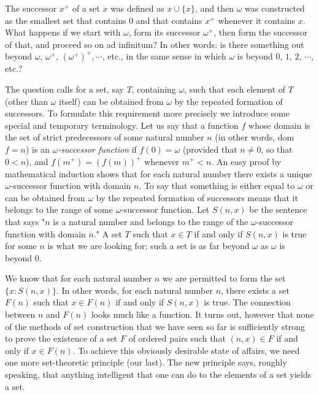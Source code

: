 
The successor $x^{+}$ of a set $x$ was defined as $x \cup \{ x \} $, and then $\omega$ was constructed as the smallest set that contains $0$ and that contains $x^{+}$ whenever it contains $x$. What happens if we start with $\omega$, form its successor $\omega^{+}$, then form the successor of that, and proceed so on ad infinitum? In other words: is there something out beyond $\omega$, $\omega^{+}$, $(\omega^{+})^{+}, \cdots$, etc., in the same sense in which $\omega$ is beyond $0$, $1$, $2$, $\cdots$, etc.? 

The question calls for a set, say $T$, containing $\omega$, such that each element of $T$ (other than $\omega$ itself) can be obtained from $\omega$ by the repeated formation of successors. To formulate this requirement more precisely we introduce some special and temporary terminology. Let us say that a function $f$ whose domain is the set of strict predecessors of some natural number $n$  (in other words, dom $f = n$) is an \textit{$\omega$-successor function} if $f(0) = \omega$ (provided that $n \neq 0$, so that $0 < n$), and $f(m^{+}) = (f(m))^{+}$ whenever $m^{+} < n$. An easy proof by mathematical induction shows that for each natural number there exists a unique $\omega$-successor function with domain $n$. To say that something is either equal to $\omega$ or can be obtained from $\omega$ by the repeated formation of successors means that it belongs to the range of some $\omega$-successor function. Let $S(n,x)$ be the sentence that says "$n$ is a natural number and belongs to the range of the $\omega$-successor function with domain $n$." A set $T$ such that $x \in T$ if and only if $S(n,x)$ is true for some $n$ is what we are looking for; such a set is as far beyond $\omega$ as $\omega$ is beyond $0$. 

We know that for each natural number $n$ we are permitted to form the set $\{ x: S(n,x) \}$. In other words, for each natural number $n$, there exists a set $F(n)$ such that $x \in F(n)$ if and only if $S(n,x)$ is true. The connection between $n$ and $F(n)$ looks much like a function. It turns out, however that none of the methods of set construction that we have seen so far is sufficiently strong to prove the existence of a set $F$ of ordered pairs such that $(n, x) \in F$ if and only if $x \in F(n)$. To achieve this obviously desirable state of affairs, we need one more set-theoretic principle (our last). The new principle says, roughly speaking, that anything intelligent that one can do to the elements of a set yields a set.

